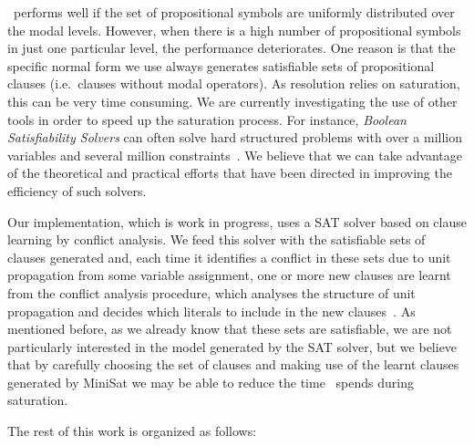 \ksp~performs well if the set of propositional symbols are uniformly distributed
over the modal levels. However, when there is a high number of propositional
symbols in just one particular level, the performance deteriorates. One reason
is that the specific normal form we use always generates satisfiable sets of
propositional clauses (i.e.\ clauses without modal operators). As resolution
relies on saturation, this can be very time consuming. We are currently
investigating the use of other tools in order to speed up the saturation
process. For instance, \emph{Boolean Satisfiability Solvers} can often solve
hard structured problems with over a million variables and several million
constraints~\cite{satchapter}. We believe that we can take advantage of the
theoretical and practical efforts that have been directed in improving the
efficiency of such solvers. 

Our implementation, which is work in progress, uses a SAT solver based on clause
learning by conflict analysis. We feed this solver with the satisfiable sets of
clauses generated and, each time it identifies a conflict in these sets due to
unit propagation from some variable assignment, one or more new clauses are
learnt from the conflict analysis procedure, which analyses the structure of
unit propagation and decides which literals to include in the new
clauses~\cite{cdclchapter}. As mentioned before, as we already know that these
sets are satisfiable, we are not particularly interested in the model generated
by the SAT solver, but we believe that by carefully choosing the set of clauses
and making use of the learnt clauses generated by MiniSat we may be able to
reduce the time \ksp~spends during saturation. 

The rest of this work is organized as follows:
